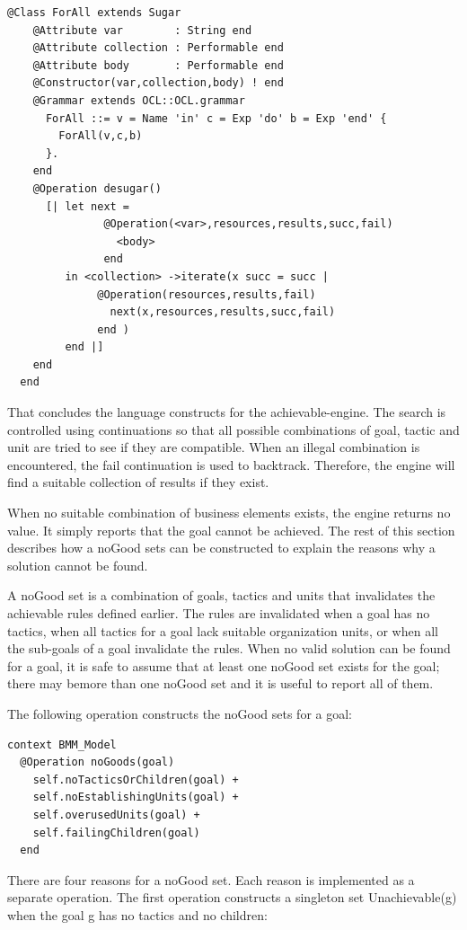 \begin{lstlisting}
@Class ForAll extends Sugar
    @Attribute var        : String end
    @Attribute collection : Performable end
    @Attribute body       : Performable end
    @Constructor(var,collection,body) ! end
    @Grammar extends OCL::OCL.grammar
      ForAll ::= v = Name 'in' c = Exp 'do' b = Exp 'end' {
        ForAll(v,c,b)
      }.
    end
    @Operation desugar()
      [| let next = 
               @Operation(<var>,resources,results,succ,fail) 
                 <body> 
               end
         in <collection> ->iterate(x succ = succ |
              @Operation(resources,results,fail)
                next(x,resources,results,succ,fail)
              end )
         end |]
    end
  end
\end{lstlisting}That concludes the language constructs for the achievable-engine.
The search is controlled using continuations so that all possible
combinations of goal, tactic and unit are tried to see if they are
compatible. When an illegal combination is encountered, the fail continuation
is used to backtrack. Therefore, the engine will find a suitable collection
of results if they exist. 

When no suitable combination of business elements exists, the engine
returns no value. It simply reports that the goal cannot be achieved.
The rest of this section describes how a noGood sets can be constructed
to explain the reasons why a solution cannot be found.

A noGood set is a combination of goals, tactics and units that invalidates
the achievable rules defined earlier. The rules are invalidated when
a goal has no tactics, when all tactics for a goal lack suitable organization
units, or when all the sub-goals of a goal invalidate the rules. When
no valid solution can be found for a goal, it is safe to assume that
at least one noGood set exists for the goal; there may bemore than
one noGood set and it is useful to report all of them.

The following operation constructs the noGood sets for a goal:

\begin{lstlisting}
context BMM_Model
  @Operation noGoods(goal)
    self.noTacticsOrChildren(goal) +
    self.noEstablishingUnits(goal) +
    self.overusedUnits(goal) +
    self.failingChildren(goal)
  end
\end{lstlisting}There are four reasons for a noGood set. Each reason is implemented
as a separate operation. The first operation constructs a singleton
set Unachievable(g) when the goal g has no tactics and no children:

